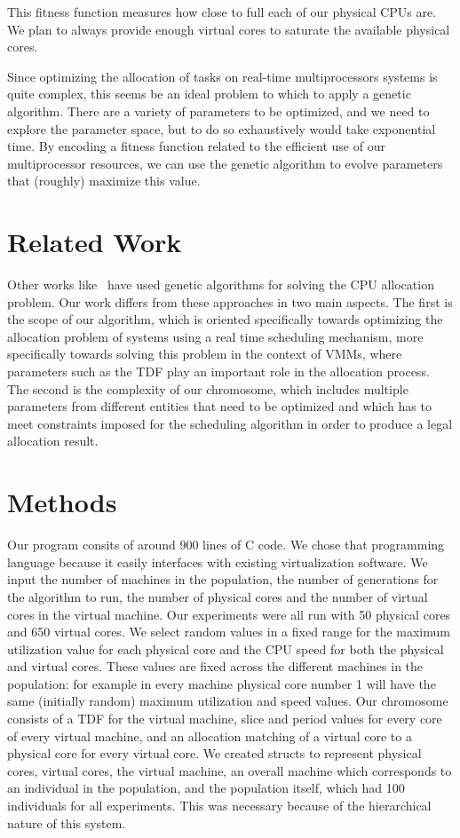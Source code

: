 \documentclass[11pt]{article}
\begin{document}
This fitness function measures how close to full each of our physical CPUs are. We plan to always provide enough virtual cores to saturate the available physical cores. 

Since optimizing the allocation of tasks on real-time multiprocessors systems is quite complex, this seems be an  ideal problem to which to apply a genetic algorithm. There are a variety of parameters to be optimized, and we need to explore the parameter space, but to do so exhaustively would take exponential time. By encoding a fitness function related to the efficient use of our multiprocessor resources, we can use the genetic algorithm to evolve parameters that (roughly) maximize this value.

\section{Related Work}

Other works like~\cite{Shahid94,Wu04anincremental,Omara2010} have used genetic algorithms for solving the CPU allocation problem. Our work differs from these approaches in two main aspects. The first is the scope of our algorithm, which is oriented specifically towards optimizing the allocation problem of systems using a real time scheduling mechanism, more specifically towards solving this problem in the context of VMMs, where parameters such as the TDF play an important role in the allocation process. The second is the complexity of our chromosome, which includes multiple parameters from different entities that need to be optimized and which has to meet constraints imposed for the scheduling algorithm in order to produce a legal allocation result.


\section{Methods}

Our program consits of around 900 lines of C code. We chose that programming language because it easily interfaces with existing virtualization software. We input the number of machines in the population, the number of generations for the algorithm to run, the number of physical cores and the number of virtual cores in the virtual machine. Our experiments were all run with 50 physical cores and 650 virtual cores. We select random values in a fixed range for the maximum utilization value for each physical core and the CPU speed for both the physical and virtual cores. These values are fixed across the different machines in the population: for example in every machine physical core number 1 will have the same (initially random) maximum utilization and speed values. Our chromosome consists of a TDF for the virtual machine, slice and period values for every core of every virtual machine, and an allocation matching of a virtual core to a physical core for every virtual core. We created structs to represent physical cores, virtual cores, the virtual machine, an overall machine which corresponds to an individual in the population, and the population itself, which had 100 individuals for all experiments. This was necessary because of the hierarchical nature of this system. 
\end{document}
